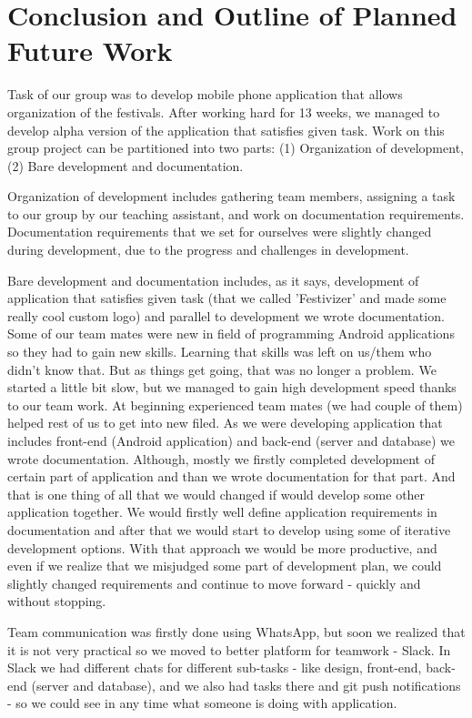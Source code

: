 \chapter{Conclusion and Outline of Planned Future Work}
		
		Task of our group was to develop mobile phone application that allows organization of the festivals. After working hard for 13 weeks, we managed to develop alpha version of the application that satisfies given task. Work on this group project can be partitioned into two parts: (1) Organization of development, (2) Bare development and documentation.
		
		Organization of development includes gathering team members, assigning a task to our group by our teaching assistant, and work on documentation requirements. Documentation requirements that we set for ourselves were slightly changed during development, due to the progress and challenges in development.
		
		Bare development and documentation includes, as it says, development of application that satisfies given task (that we called 'Festivizer' and made some really cool custom logo) and parallel to development we wrote documentation. Some of our team mates were new in field of programming Android applications so they had to gain new skills. Learning that skills was left on us/them who didn't know that. But as things get going, that was no longer a problem. We started a little bit slow, but we managed to gain high development speed thanks to our team work. At beginning experienced team mates (we had couple of them) helped rest of us to get into new filed. As we were developing application that includes front-end (Android application) and back-end (server and database) we wrote documentation. Although, mostly we firstly completed development of certain part of application and than we wrote documentation for that part. And that is one thing of all that we would changed if would develop some other application together. We would firstly well define application requirements in documentation and after that we would start to develop using some of iterative development options. With that approach we would be more productive, and even if we realize that we misjudged some part of development plan, we could slightly changed requirements and continue to move forward - quickly and without stopping.
		
		Team communication was firstly done using WhatsApp, but soon we realized that it is not very practical so we moved to better platform for teamwork - Slack. In Slack we had different chats for different sub-tasks - like design, front-end, back-end (server and database), and we also had tasks there and git push notifications - so we could see in any time what someone is doing with application.
		
